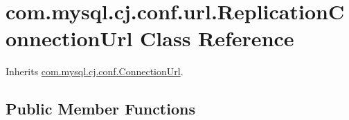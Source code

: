 \hypertarget{classcom_1_1mysql_1_1cj_1_1conf_1_1url_1_1_replication_connection_url}{}\section{com.\+mysql.\+cj.\+conf.\+url.\+Replication\+Connection\+Url Class Reference}
\label{classcom_1_1mysql_1_1cj_1_1conf_1_1url_1_1_replication_connection_url}


Inherits \mbox{\hyperlink{classcom_1_1mysql_1_1cj_1_1conf_1_1_connection_url}{com.\+mysql.\+cj.\+conf.\+Connection\+Url}}.

\subsection*{Public Member Functions}
